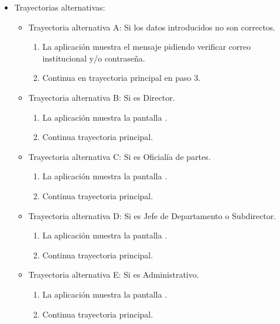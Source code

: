 \begin{itemize}
\begin{enumerate}
		\end{enumerate}
	\item Trayectorias alternativas:
		\begin{itemize}
			\item Trayectoria alternativa A: Si los datos introducidos no son correctos.
				\begin{enumerate}
					\item La aplicación muestra el mensaje  pidiendo verificar correo institucional y/o contraseña.
					\item Continua en trayectoria principal en paso 3.
				\end{enumerate}
			\item Trayectoria alternativa B: Si es Director.
				\begin{enumerate}
					\item La aplicación muestra la pantalla .
					\item Continua trayectoria principal.
				\end{enumerate}
			\item Trayectoria alternativa C: Si es Oficialía de partes.
				\begin{enumerate}
					\item La aplicación muestra la pantalla .
					\item Continua trayectoria principal.
				\end{enumerate}
			\item Trayectoria alternativa D: Si es Jefe de Departamento o Subdirector.
				\begin{enumerate}
					\item La aplicación muestra la pantalla .
					\item Continua trayectoria principal.
				\end{enumerate}
			\item Trayectoria alternativa E: Si es Administrativo.
				\begin{enumerate}
					\item La aplicación muestra la pantalla .
					\item Continua trayectoria principal.
				\end{enumerate}
		\end{itemize}
\end{itemize}

\newpage
